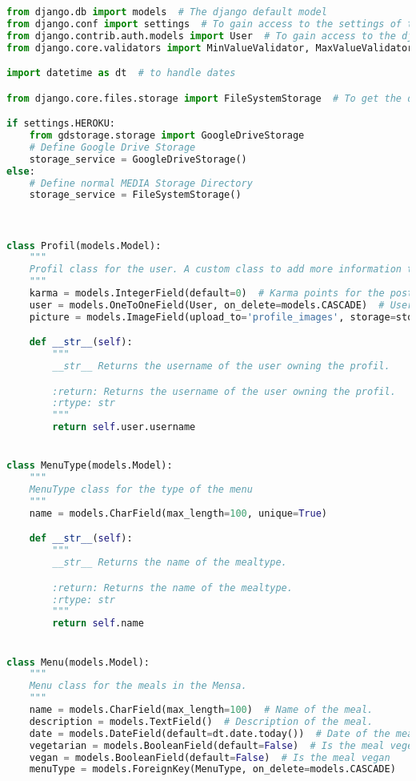 \begin{lstlisting}[language=Python]
from django.db import models  # The django default model
from django.conf import settings  # To gain access to the settings of the app
from django.contrib.auth.models import User  # To gain access to the django internal user
from django.core.validators import MinValueValidator, MaxValueValidator  # For the Rating to validate if the rating is in the range of 1-5

import datetime as dt  # to handle dates

from django.core.files.storage import FileSystemStorage  # To get the default storage service from django

if settings.HEROKU:
    from gdstorage.storage import GoogleDriveStorage
    # Define Google Drive Storage
    storage_service = GoogleDriveStorage()
else:
    # Define normal MEDIA Storage Directory
    storage_service = FileSystemStorage()
    


class Profil(models.Model):
    """
    Profil class for the user. A custom class to add more information to the user.
    """
    karma = models.IntegerField(default=0)  # Karma points for the posts from the user. 
    user = models.OneToOneField(User, on_delete=models.CASCADE)  # User linked to the profil. -> The profil is deleted when the user is deleted.
    picture = models.ImageField(upload_to='profile_images', storage=storage_service, blank=True, null=True)  # Image of the user.

    def __str__(self):
        """
        __str__ Returns the username of the user owning the profil.

        :return: Returns the username of the user owning the profil.
        :rtype: str
        """
        return self.user.username


class MenuType(models.Model):
    """
    MenuType class for the type of the menu
    """
    name = models.CharField(max_length=100, unique=True)

    def __str__(self):
        """
        __str__ Returns the name of the mealtype.

        :return: Returns the name of the mealtype.
        :rtype: str
        """
        return self.name


class Menu(models.Model):
    """
    Menu class for the meals in the Mensa.
    """
    name = models.CharField(max_length=100)  # Name of the meal.
    description = models.TextField()  # Description of the meal.
    date = models.DateField(default=dt.date.today())  # Date of the meal. Default is the current date.
    vegetarian = models.BooleanField(default=False)  # Is the meal vegetarian?
    vegan = models.BooleanField(default=False)  # Is the meal vegan
    menuType = models.ForeignKey(MenuType, on_delete=models.CASCADE)


\end{lstlisting}

